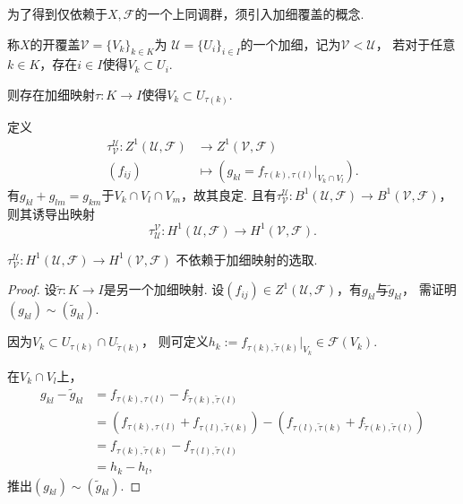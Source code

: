 为了得到仅依赖于$X, \mathscr{F}$的一个上同调群，须引入加细覆盖的概念.
		
\begin{definition}
	称$X$的开覆盖$\mathscr{V}=\{V_k\}_{k\in K}$为
    $\mathscr{U}=\{U_i\}_{i\in I}$的一个加细，记为$\mathscr{V}<\mathscr{U}$，
    若对于任意$k\in K$，存在$i\in I$使得$V_k\subset U_i$.\par
	则存在加细映射$\tau\colon K\rightarrow I$使得$V_k\subset U_{\tau(k)}$.
\end{definition}
		
\begin{definition}定义
	\begin{align*}
		\tau^{\mathscr{U}}_{\mathscr{V}}\colon Z^1(\mathscr{U}, \mathscr{F}) &\rightarrow Z^1(\mathscr{V},\mathscr{F})\\	
		(f_{ij})&\mapsto (g_{kl}=f_{\tau(k), \tau(l)}|_{V_k\cap V_l}).		
	\end{align*}
	有$g_{kl}+g_{lm}=g_{km}$于$V_k\cap V_l \cap V_m$，故其良定. 
    且有$\tau^{\mathscr{U}}_{\mathscr{V}}\colon B^1(\mathscr{U},\mathscr{F})
    \rightarrow B^1(\mathscr{V},\mathscr{F})$，则其诱导出映射
	$$\tau^{\mathscr{V}}_{\mathscr{U}}\colon H^1(\mathscr{U},\mathscr{F})
    \rightarrow H^1(\mathscr{V},\mathscr{F}).$$
\end{definition}
		
\begin{lemma}
	$\tau^{\mathscr{U}}_{\mathscr{V}}\colon 
    H^1(\mathscr{U},\mathscr{F})\rightarrow H^1(\mathscr{V},\mathscr{F})$
    不依赖于加细映射的选取.
\end{lemma}
		
\begin{proof}
	设$\tilde{\tau}\colon K\rightarrow I$是另一个加细映射. 
    设$(f_{ij})\in Z^1(\mathscr{U}, \mathscr{F})$，有$g_{kl}$与$\tilde{g}_{kl}$，
    需证明$(g_{kl})\sim (\tilde{g}_{kl})$.

	因为$V_k\subset U_{\tau(k)}\cap U_{\tilde{\tau}(k)}$，
    则可定义$h_k:=f_{\tau(k),\tilde{\tau}(k)}|_{V_k}\in \mathscr{F}(V_k)$.\par
	在$V_k\cap V_l$上，
	\begin{align*}
		g_{kl}-\tilde{g}_{kl}&=f_{\tau(k),\tau(l)}-f_{\tilde{\tau}(k), \tilde{\tau}(l)}\\
		&=(f_{\tau(k),\tau(l)}+f_{\tau(l),\tilde{\tau}(k)})
        -(f_{\tau(l),\tilde{\tau}(k)}+f_{\tilde{\tau}(k),\tilde{\tau}(l)})\\
		&=f_{\tau(k),\tilde{\tau}(k)}-f_{\tau(l),\tilde{\tau}(l)}\\
		&=h_k-h_l	,
	\end{align*}
	推出$(g_{kl})\sim (\tilde{g}_{kl})$.
\end{proof}
		
